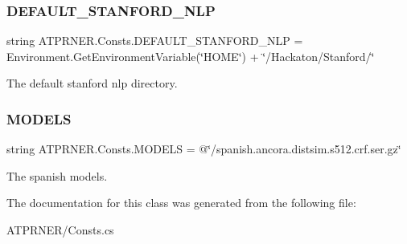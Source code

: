 \subsubsection{\texorpdfstring{D\+E\+F\+A\+U\+L\+T\+\_\+\+S\+T\+A\+N\+F\+O\+R\+D\+\_\+\+N\+LP}{DEFAULT\_STANFORD\_NLP}}
{\footnotesize\ttfamily string A\+T\+P\+R\+N\+E\+R.\+Consts.\+D\+E\+F\+A\+U\+L\+T\+\_\+\+S\+T\+A\+N\+F\+O\+R\+D\+\_\+\+N\+LP = Environment.\+Get\+Environment\+Variable(\char`\"{}H\+O\+ME\char`\"{}) + \char`\"{}/Hackaton/Stanford/\char`\"{}\hspace{0.3cm}{\ttfamily [static]}}



The default stanford nlp directory. 

\hypertarget{class_a_t_p_r_n_e_r_1_1_consts_a2e80ccd5f9a0b20cf5ce31386604a3b2}{}\label{class_a_t_p_r_n_e_r_1_1_consts_a2e80ccd5f9a0b20cf5ce31386604a3b2} 
\subsubsection{\texorpdfstring{M\+O\+D\+E\+LS}{MODELS}}
{\footnotesize\ttfamily string A\+T\+P\+R\+N\+E\+R.\+Consts.\+M\+O\+D\+E\+LS = @\char`\"{}/spanish.\+ancora.\+distsim.\+s512.\+crf.\+ser.\+gz\char`\"{}\hspace{0.3cm}{\ttfamily [static]}}



The spanish models. 



The documentation for this class was generated from the following file\+:\begin{DoxyCompactItemize}
\item 
A\+T\+P\+R\+N\+E\+R/Consts.\+cs\end{DoxyCompactItemize}
